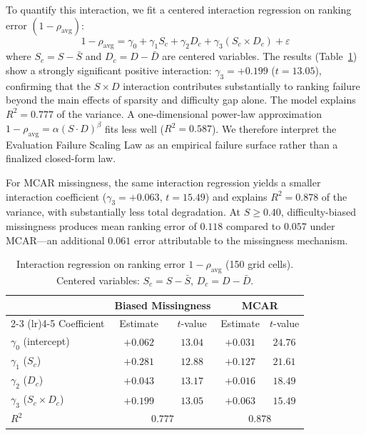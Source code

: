 \documentclass[11pt,a4paper]{article}
\begin{document}
To quantify this interaction, we fit a centered interaction regression on ranking error $(1 - \rho_{\text{avg}})$:
\begin{equation}
1 - \rho_{\text{avg}} = \gamma_0 + \gamma_1 S_c + \gamma_2 D_c + \gamma_3 (S_c \times D_c) + \varepsilon
\label{eq:interaction}
\end{equation}
where $S_c = S - \bar{S}$ and $D_c = D - \bar{D}$ are centered variables. The results (Table~\ref{tab:regression}) show a strongly significant positive interaction: $\gamma_3 = +0.199$ ($t = 13.05$), confirming that the $S \times D$ interaction contributes substantially to ranking failure beyond the main effects of sparsity and difficulty gap alone. The model explains $R^2 = 0.777$ of the variance. A one-dimensional power-law approximation $1 - \rho_{\text{avg}} = \alpha (S \cdot D)^{\beta}$ fits less well ($R^2 = 0.587$). We therefore interpret the Evaluation Failure Scaling Law as an empirical failure surface rather than a finalized closed-form law.

For MCAR missingness, the same interaction regression yields a smaller interaction coefficient ($\gamma_3 = +0.063$, $t = 15.49$) and explains $R^2 = 0.878$ of the variance, with substantially less total degradation. At $S \geq 0.40$, difficulty-biased missingness produces mean ranking error of $0.118$ compared to $0.057$ under MCAR---an additional $0.061$ error attributable to the missingness mechanism.

\begin{table}[t]
\centering
\caption{Interaction regression on ranking error $1 - \rho_{\text{avg}}$ (150 grid cells). Centered variables: $S_c = S - \bar{S}$, $D_c = D - \bar{D}$.}
\label{tab:regression}
\small
\begin{tabular}{lcccc}
\toprule
& \multicolumn{2}{c}{Biased Missingness} & \multicolumn{2}{c}{MCAR} \\
\cmidrule(lr){2-3} \cmidrule(lr){4-5}
Coefficient & Estimate & $t$-value & Estimate & $t$-value \\
\midrule
$\gamma_0$ (intercept) & $+0.062$ & $13.04$ & $+0.031$ & $24.76$ \\
$\gamma_1$ ($S_c$) & $+0.281$ & $12.88$ & $+0.127$ & $21.61$ \\
$\gamma_2$ ($D_c$) & $+0.043$ & $13.17$ & $+0.016$ & $18.49$ \\
$\gamma_3$ ($S_c \times D_c$) & $+0.199$ & $13.05$ & $+0.063$ & $15.49$ \\
\midrule
$R^2$ & \multicolumn{2}{c}{$0.777$} & \multicolumn{2}{c}{$0.878$} \\
\bottomrule
\end{tabular}
\end{table}
\end{document}
